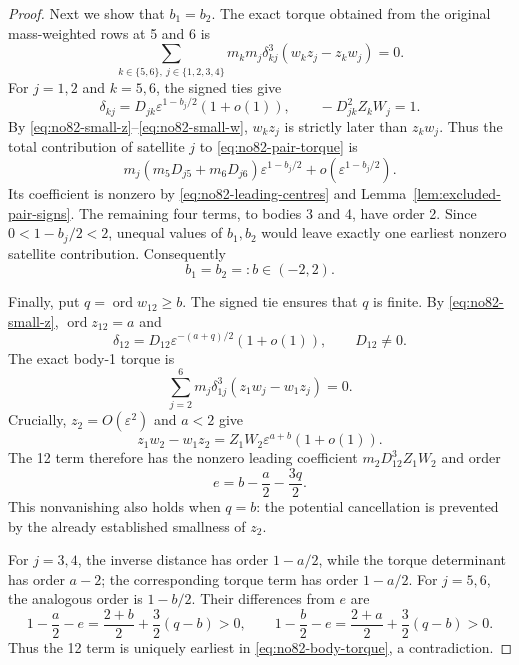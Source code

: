 \documentclass[11pt]{amsart}
\theoremstyle{remark}
\newcommand{\ord}{\operatorname{ord}}
\begin{document}
\begin{proof}
Next we show that $b_1=b_2$. The exact torque obtained from the original mass-weighted rows at 5 and 6 is
\begin{equation}\label{eq:no82-pair-torque}
\sum_{k\in\{5,6\},\ j\in\{1,2,3,4\}}
m_km_j\delta_{kj}^3(w_kz_j-z_kw_j)=0.
\end{equation}
For $j=1,2$ and $k=5,6$, the signed ties give
\[
\delta_{kj}=D_{jk}\varepsilon^{1-b_j/2}(1+o(1)),
\qquad -D_{jk}^2Z_kW_j=1.
\]
By \eqref{eq:no82-small-z}--\eqref{eq:no82-small-w}, $w_kz_j$ is strictly later than $z_kw_j$. Thus the total contribution of satellite $j$ to \eqref{eq:no82-pair-torque} is
\begin{equation}\label{eq:no82-satellite-torque}
m_j(m_5D_{j5}+m_6D_{j6})\varepsilon^{1-b_j/2}
+o(\varepsilon^{1-b_j/2}).
\end{equation}
Its coefficient is nonzero by \eqref{eq:no82-leading-centres} and Lemma~\ref{lem:excluded-pair-signs}. The remaining four terms, to bodies 3 and 4, have order 2. Since $0<1-b_j/2<2$, unequal values of $b_1,b_2$ would leave exactly one earliest nonzero satellite contribution. Consequently
\[
b_1=b_2=:b\in(-2,2).
\]

Finally, put $q=\ord w_{12}\ge b$. The signed tie ensures that $q$ is finite. By \eqref{eq:no82-small-z}, $\ord z_{12}=a$ and
\[
\delta_{12}=D_{12}\varepsilon^{-(a+q)/2}(1+o(1)),\qquad D_{12}\ne0.
\]
The exact body-1 torque is
\begin{equation}\label{eq:no82-body-torque}
\sum_{j=2}^6m_j\delta_{1j}^3(z_1w_j-w_1z_j)=0.
\end{equation}
Crucially, $z_2=O(\varepsilon^2)$ and $a<2$ give
\[
z_1w_2-w_1z_2=Z_1W_2\varepsilon^{a+b}(1+o(1)).
\]
The 12 term therefore has the nonzero leading coefficient $m_2D_{12}^3Z_1W_2$ and order
\[
e=b-\frac a2-\frac{3q}{2}.
\]
This nonvanishing also holds when $q=b$: the potential cancellation is prevented by the already established smallness of $z_2$.

For $j=3,4$, the inverse distance has order $1-a/2$, while the torque determinant has order $a-2$; the corresponding torque term has order $1-a/2$. For $j=5,6$, the analogous order is $1-b/2$. Their differences from $e$ are
\[
1-\frac a2-e=\frac{2+b}{2}+\frac32(q-b)>0,
\qquad
1-\frac b2-e=\frac{2+a}{2}+\frac32(q-b)>0.
\]
Thus the 12 term is uniquely earliest in \eqref{eq:no82-body-torque}, a contradiction.
\end{proof}
\end{document}
